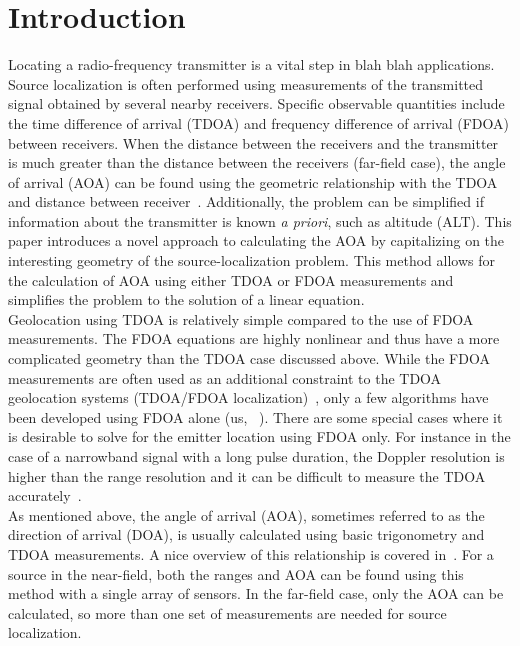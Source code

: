 \section{Introduction}
\label{s:intro}
Locating a radio-frequency transmitter is a vital step in blah blah applications. Source localization is often performed using measurements of the transmitted signal obtained by several nearby receivers. Specific observable quantities include the time difference of arrival (TDOA) and frequency difference of arrival (FDOA) between receivers. When the distance between the receivers and the transmitter is much greater than the distance between the receivers (far-field case), the angle of arrival (AOA) can be found using the geometric relationship with the TDOA and distance between receiver~\cite{Benesty2008}. Additionally, the problem can be simplified if information about the transmitter is known {\em a priori}, such as altitude (ALT). This paper introduces a novel approach to calculating the AOA by capitalizing on the interesting geometry of the source-localization problem. This method allows for the calculation of AOA using either TDOA or FDOA measurements and simplifies the problem to the solution of a linear equation. \\

Geolocation using TDOA is relatively simple compared to the use of FDOA measurements. The FDOA equations are highly nonlinear and thus have a more complicated geometry than the TDOA case discussed above. While the FDOA measurements are often used as an additional constraint to the TDOA geolocation systems (TDOA/FDOA localization)~\cite{Ho1997}, only a few algorithms have been developed using FDOA alone (us, ~\cite{Jinzhou2012}). There are some special cases where it is desirable to solve for the emitter location using FDOA only. For instance in the case of a narrowband signal with a long pulse duration, the Doppler resolution is higher than the range resolution and it can be difficult to measure the TDOA accurately~\cite{Cheney2009,Mason2005,Jinzhou2012}. \\

As mentioned above, the angle of arrival (AOA), sometimes referred to as the direction of arrival (DOA), is usually calculated using basic trigonometry and TDOA measurements. A nice overview of this relationship is covered in~\cite{Benesty2008}. For a source in the near-field, both the ranges and AOA can be found using this method with a single array of sensors. In the far-field case, only the AOA can be calculated, so more than one set of measurements are needed for source localization.~\cite{Benesty2008}

